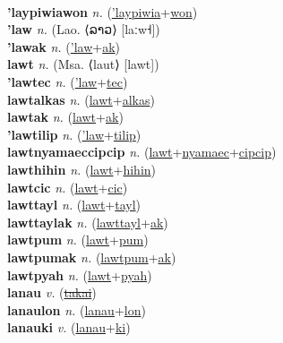  \label{'laypiwiaak} \\
\textbf{'laypiwiawon} \textit{n.} (\hyperref['laypiwia]{'laypiwia}+\hyperref[won]{won})
 \label{'laypiwiawon} \\
\textbf{'law} \textit{n.} (Lao. ⟨ລາວ⟩ [laːw˧])
 \label{'law} \\
\textbf{'lawak} \textit{n.} (\hyperref['law]{'law}+\hyperref[ak]{ak})
 \label{'lawak} \\
\textbf{lawt} \textit{n.} (Msa. ⟨laut⟩ [lawt])
 \label{lawt} \\
\textbf{'lawtec} \textit{n.} (\hyperref['law]{'law}+\hyperref[tec]{tec})
 \label{'lawtec} \\
\textbf{lawtalkas} \textit{n.} (\hyperref[lawt]{lawt}+\hyperref[alkas]{alkas})
 \label{lawtalkas} \\
\textbf{lawtak} \textit{n.} (\hyperref[lawt]{lawt}+\hyperref[ak]{ak})
 \label{lawtak} \\
\textbf{'lawtilip} \textit{n.} (\hyperref['law]{'law}+\hyperref[tilip]{tilip})
 \label{'lawtilip} \\
\textbf{lawtnyamaeccipcip} \textit{n.} (\hyperref[lawt]{lawt}+\hyperref[nyamaec]{nyamaec}+\hyperref[cipcip]{cipcip})
 \label{lawtnyamaeccipcip} \\
\textbf{lawthihin} \textit{n.} (\hyperref[lawt]{lawt}+\hyperref[hihin]{hihin})
 \label{lawthihin} \\
\textbf{lawtcic} \textit{n.} (\hyperref[lawt]{lawt}+\hyperref[cic]{cic})
 \label{lawtcic} \\
\textbf{lawttayl} \textit{n.} (\hyperref[lawt]{lawt}+\hyperref[tayl]{tayl})
 \label{lawttayl} \\
\textbf{lawttaylak} \textit{n.} (\hyperref[lawttayl]{lawttayl}+\hyperref[ak]{ak})
 \label{lawttaylak} \\
\textbf{lawtpum} \textit{n.} (\hyperref[lawt]{lawt}+\hyperref[pum]{pum})
 \label{lawtpum} \\
\textbf{lawtpumak} \textit{n.} (\hyperref[lawtpum]{lawtpum}+\hyperref[ak]{ak})
 \label{lawtpumak} \\
\textbf{lawtpyah} \textit{n.} (\hyperref[lawt]{lawt}+\hyperref[pyah]{pyah})
 \label{lawtpyah} \\
\textbf{lanau} \textit{v.} (\hyperref[takai]{\sout{takai}})
 \label{lanau} \\
\textbf{lanaulon} \textit{n.} (\hyperref[lanau]{lanau}+\hyperref[lon]{lon})
 \label{lanaulon} \\
\textbf{lanauki} \textit{v.} (\hyperref[lanau]{lanau}+\hyperref[ki]{ki})
 \label{lanauki} \\

